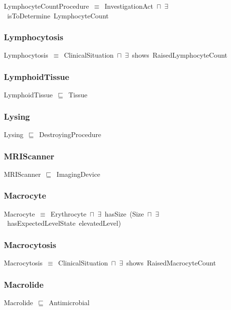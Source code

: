 \documentclass{article}
\begin{document}
LymphocyteCountProcedure~\ensuremath{\equiv}~InvestigationAct~\ensuremath{\sqcap}~\ensuremath{\exists}~isToDetermine~LymphocyteCount

\subsubsection*{Lymphocytosis}

Lymphocytosis~\ensuremath{\equiv}~ClinicalSituation~\ensuremath{\sqcap}~\ensuremath{\exists}~shows~RaisedLymphocyteCount

\subsubsection*{LymphoidTissue}

LymphoidTissue~\ensuremath{\sqsubseteq}~Tissue~

\subsubsection*{Lysing}

Lysing~\ensuremath{\sqsubseteq}~DestroyingProcedure~

\subsubsection*{MRIScanner}

MRIScanner~\ensuremath{\sqsubseteq}~ImagingDevice~

\subsubsection*{Macrocyte}

Macrocyte~\ensuremath{\equiv}~Erythrocyte~\ensuremath{\sqcap}~\ensuremath{\exists}~hasSize~(Size~\ensuremath{\sqcap}~\ensuremath{\exists}~hasExpectedLevelState~elevatedLevel)

\subsubsection*{Macrocytosis}

Macrocytosis~\ensuremath{\equiv}~ClinicalSituation~\ensuremath{\sqcap}~\ensuremath{\exists}~shows~RaisedMacrocyteCount

\subsubsection*{Macrolide}

Macrolide~\ensuremath{\sqsubseteq}~Antimicrobial~
\end{document}
